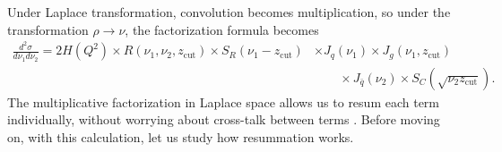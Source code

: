 \documentclass[../thesis.tex]{subfiles}
\providecommand{\zcut}{z_\mathrm{{cut}}}
\begin{document}
	Under Laplace transformation, convolution becomes multiplication, so under the transformation $\rho \to \nu$, the factorization formula becomes
	\begin{equation}\label{all-eq:factorization formula laplace}
	\begin{aligned}
		\frac{d^2\sigma}{d\nu_1 d\nu_2} = 2 H(Q^2) \times R(\nu_1, \nu_2, \zcut) \times S_R(\nu_1 - \zcut) &\times J_q(\nu_1) \times J_g(\nu_1, \zcut) \\
		&\qquad\times J_{\bar q}(\nu_2) \times S_C(\sqrt{\nu_2 \zcut}).
	\end{aligned}
	\end{equation}
	The multiplicative factorization in Laplace space allows us to resum each term individually, without worrying about cross-talk between terms \cite{frye_factorization_2016}. Before moving on, with this calculation, let us study how resummation works.
\end{document}
